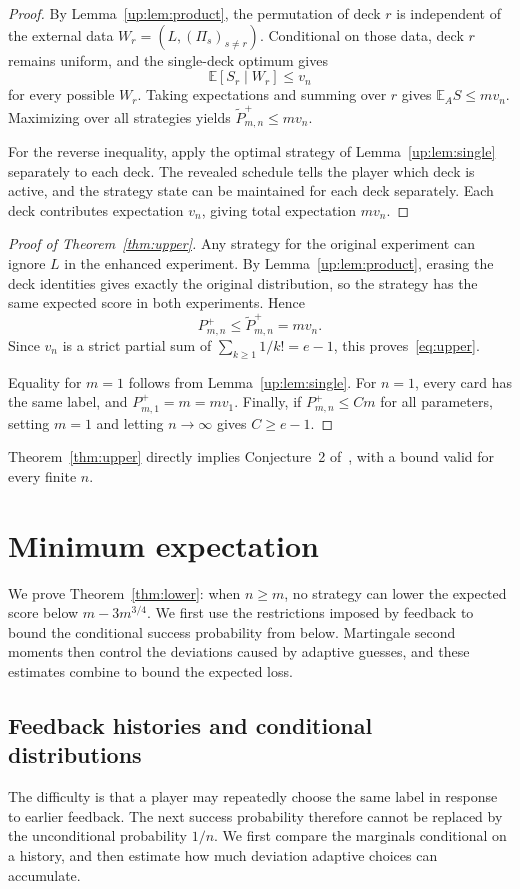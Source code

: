 \documentclass[11pt,reqno]{amsart}
\numberwithin{equation}{section}
\theoremstyle{remark}
\theoremstyle{definition}
\newcommand{\E}{\mathbb E}
\begin{document}
\begin{proof}
By Lemma~\ref{up:lem:product}, the permutation of deck $r$ is independent of the external data $W_r=(L,(\Pi_s)_{s\ne r})$. Conditional on those data, deck $r$ remains uniform, and the single-deck optimum gives
\[
 \E[S_r\mid W_r]\le v_n
\]
for every possible $W_r$. Taking expectations and summing over $r$ gives $\mathbb E_A S\le mv_n$. Maximizing over all strategies yields $\widetilde P^+_{m,n}\le mv_n$.

For the reverse inequality, apply the optimal strategy of Lemma~\ref{up:lem:single} separately to each deck. The revealed schedule tells the player which deck is active, and the strategy state can be maintained for each deck separately. Each deck contributes expectation $v_n$, giving total expectation $mv_n$.
\end{proof}
\begin{proof}[Proof of Theorem~\ref{thm:upper}]
Any strategy for the original experiment can ignore $L$ in the enhanced experiment. By Lemma~\ref{up:lem:product}, erasing the deck identities gives exactly the original distribution, so the strategy has the same expected score in both experiments. Hence
\[
 P^+_{m,n}\le\widetilde P^+_{m,n}=mv_n.
\]
Since $v_n$ is a strict partial sum of $\sum_{k\ge1}1/k!=e-1$, this proves~\eqref{eq:upper}.

Equality for $m=1$ follows from Lemma~\ref{up:lem:single}. For $n=1$, every card has the same label, and $P^+_{m,1}=m=mv_1$. Finally, if $P^+_{m,n}\le Cm$ for all parameters, setting $m=1$ and letting $n\to\infty$ gives $C\ge e-1$.
\end{proof}
Theorem~\ref{thm:upper} directly implies Conjecture~2 of~\cite{DGS}, with a bound valid for every finite $n$.

\section{Minimum expectation}\label{sec:minimum}
We prove Theorem~\ref{thm:lower}: when $n\ge m$, no strategy can lower the expected score below $m-3m^{3/4}$. We first use the restrictions imposed by feedback to bound the conditional success probability from below. Martingale second moments then control the deviations caused by adaptive guesses, and these estimates combine to bound the expected loss.

\subsection{Feedback histories and conditional distributions}\label{sec:conditional}
The difficulty is that a player may repeatedly choose the same label in response to earlier feedback. The next success probability therefore cannot be replaced by the unconditional probability $1/n$. We first compare the marginals conditional on a history, and then estimate how much deviation adaptive choices can accumulate.
\end{document}
